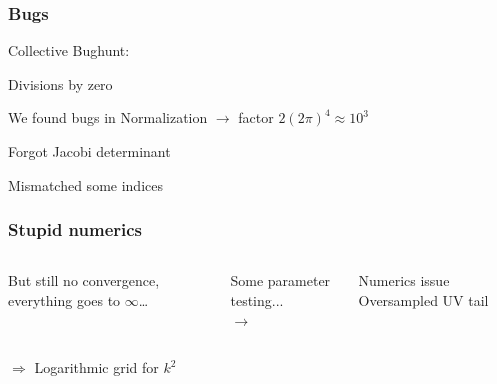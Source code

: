 \begin{frame}\frametitle{Bugs}
  {\Large Collective Bughunt:}


  {\small

    \pause
    \vspace{3mm}
    Divisions by zero

    \pause
    \vspace{3mm}
    We found bugs in Normalization $\rightarrow$ factor $2(2\pi)^4 \approx 10^3$

    \pause
    \vspace{3mm}
    Forgot Jacobi determinant

    \pause
    \vspace{3mm}
    Mismatched some indices
  }
\end{frame}

\begin{frame}\frametitle{Stupid numerics}
  \begin{columns}
    \centering
    \begin{column}{0.4\linewidth}
      \begin{block}{}
        \vspace{-0.cm}
        But still no convergence, everything goes to $\infty$\ldots
      \end{block}
    \end{column}
    \pause
    \begin{column}{0.2\linewidth}
      \centering
      {\tiny
        Some parameter testing...\\
      }
      $\rightarrow$
    \end{column}
    \pause
    \begin{column}{0.4\linewidth}
      \begin{block}{Numerics issue}
        \vspace{-0.cm}
          Oversampled UV tail
      \end{block}
    \end{column}
  \end{columns}
  \pause
  \vspace{1cm}
  \centering
  $\Rightarrow$ Logarithmic grid for $k^2$
\end{frame}

